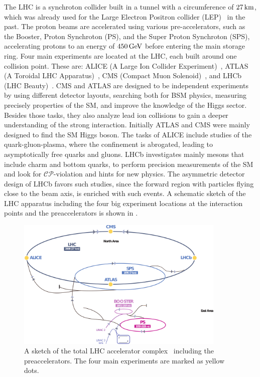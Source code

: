 The LHC is a synchroton collider built in a tunnel with a circumference of $27\,\text{km}$, which was already used for the Large Electron Positron collider (LEP)~\cite{LEPCollider} in the past. The proton beams are accelerated using various pre-accelerators, such as the Booster, Proton Synchroton (PS), and the Super Proton Synchroton (SPS), accelerating protons to an energy of $450\,\text{Ge\hspace{-.08em}V}$ before entering the main storage ring. Four main experiments are located at the LHC, each built around one collision point. These are: ALICE (A Large Ion Collider Experiment)~\cite{ALICE}, ATLAS (A Toroidal LHC Apparatus)~\cite{ATLAS}, CMS (Compact Muon Solenoid)~\cite{CMS}, and LHCb (LHC Beauty)~\cite{LHCb}. CMS and ATLAS are designed to be independent experiments by using different detector layouts, searching both for BSM physics, measuring precisely properties of the SM, and improve the knowledge of the Higgs sector. Besides those tasks, they also analyze lead ion collisions to gain a deeper understanding of the strong interaction. Initially ATLAS and CMS were mainly designed to find the SM Higgs boson. The tasks of ALICE include studies of the quark-gluon-plasma, where the confinement is abrogated, leading to asymptotically free quarks and gluons. LHCb investigates mainly mesons that include charm and bottom quarks, to perform precision measurements of the SM and look for $\mathcal{CP}$-violation and hints for new physics. The asymmetric detector design of LHCb favors such studies, since the forward region with particles flying close to the beam axis, is enriched with such events. A schematic sketch of the LHC apparatus including the four big experiment locations at the interaction points and the preaccelerators is shown in .\\
\begin{figure}[tbp]
 \centering
 \includegraphics[width=0.89\textwidth]{figures/general/LHC}
 \caption{A sketch of the total LHC accelerator complex~\cite{LHCPicture} including the preaccelerators. The four main experiments are marked as yellow dots.}
 \label{fig:LHC}
\end{figure}
